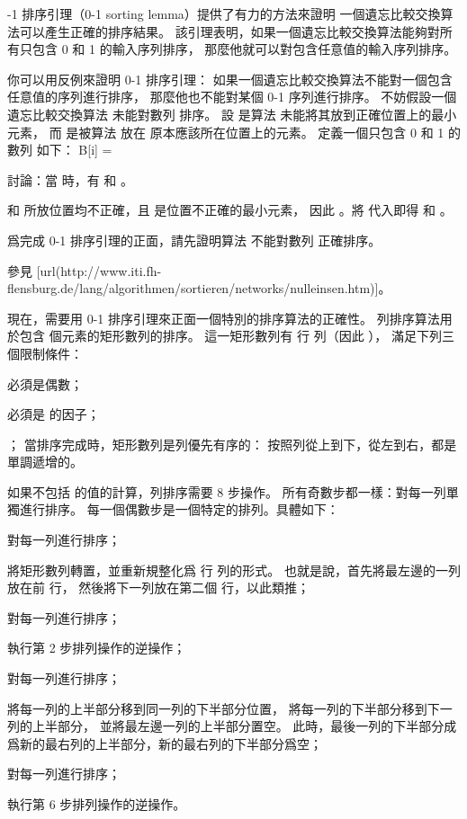 {-1 排序引理（0-1 sorting lemma）}提供了有力的方法來證明
一個遺忘比較交換算法可以產生正確的排序結果。
該引理表明，如果一個遺忘比較交換算法能夠對所有只包含 0 和 1 的輸入序列排序，
那麼他就可以對包含任意值的輸入序列排序。

你可以用反例來證明 0-1 排序引理：
如果一個遺忘比較交換算法不能對一個包含任意值的序列進行排序，
那麼他也不能對某個 0-1 序列進行排序。
不妨假設一個遺忘比較交換算法  未能對數列  排序。
設  是算法  未能將其放到正確位置上的最小元素，
而  是被算法  放在  原本應該所在位置上的元素。
定義一個只包含 0 和 1 的數列  如下：
\startformula
B[i] = \startmathcases
{}	\MC {} \NR
{}	\MC {} \NR
\stopmathcases
\stopformula

\startigBase[a]
\startitem
討論：當  時，有  和 。
\stopitem

\startANSWER
{} 和  所放位置均不正確，且  是位置不正確的最小元素，
因此 。將  代入即得  和 。
\stopANSWER

\startitem
爲完成 0-1 排序引理的正面，請先證明算法  不能對數列  正確排序。
\stopitem

\startANSWER
參見 [url(http://www.iti.fh-flensburg.de/lang/algorithmen/sortieren/networks/nulleinsen.htm)]。
\stopANSWER
\stopigBase

現在，需要用 0-1 排序引理來正面一個特別的排序算法的正確性。
{\EMP 列排序}算法用於包含  個元素的矩形數列的排序。
這一矩形數列有  行  列（因此 ），
滿足下列三個限制條件：
\startigBase[2][indentnext=no]
\item {} 必須是偶數；
\item {} 必須是  的因子；
\item {}；
\stopigBase
當排序完成時，矩形數列是{\EMP 列優先有序}的：
按照列從上到下，從左到右，都是單調遞增的。

如果不包括  的值的計算，列排序需要 8 步操作。
所有奇數步都一樣：對每一列單獨進行排序。
每一個偶數步是一個特定的排列。具體如下：
\startigNum[n]
\item 對每一列進行排序；
\item 將矩形數列轉置，並重新規整化爲  行  列的形式。
也就是說，首先將最左邊的一列放在前  行，
然後將下一列放在第二個  行，以此類推；
\item 對每一列進行排序；
\item 執行第 2 步排列操作的逆操作；
\item 對每一列進行排序；
\item 將每一列的上半部分移到同一列的下半部分位置，
將每一列的下半部分移到下一列的上半部分，
並將最左邊一列的上半部分置空。
此時，最後一列的下半部分成爲新的最右列的上半部分，新的最右列的下半部分爲空；
\item 對每一列進行排序；
\item 執行第 6 步排列操作的逆操作。
\stopigNum

